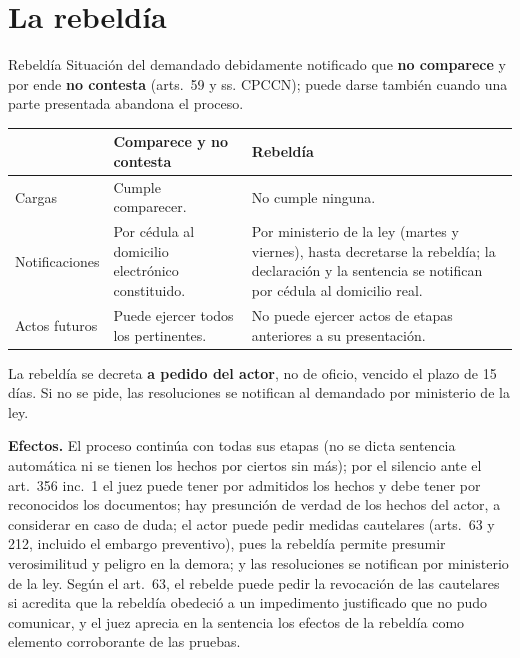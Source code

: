\documentclass[12pt,oneside]{book}
\renewcommand{\arraystretch}{1.15}
\begin{document}
\section{La rebeldía}

\begin{definicion}{Rebeldía}
Situación del demandado debidamente notificado que \textbf{no comparece} y por ende \textbf{no contesta} (arts.~59 y ss. CPCCN); puede darse también cuando una parte presentada abandona el proceso.
\end{definicion}

\begin{table}[H]
\centering
\renewcommand{\arraystretch}{1.25}
\begin{tabularx}{\textwidth}{>{\RaggedRight\arraybackslash}p{}>{\RaggedRight\arraybackslash}X>{\RaggedRight\arraybackslash}X}
\toprule
 & \textbf{Comparece y no contesta} & \textbf{Rebeldía} \\
\midrule
Cargas & Cumple comparecer. & No cumple ninguna. \\
Notificaciones & Por cédula al domicilio electrónico constituido. & Por ministerio de la ley (martes y viernes), hasta decretarse la rebeldía; la declaración y la sentencia se notifican por cédula al domicilio real. \\
Actos futuros & Puede ejercer todos los pertinentes. & No puede ejercer actos de etapas anteriores a su presentación. \\
\bottomrule
\end{tabularx}
\end{table}

La rebeldía se decreta \textbf{a pedido del actor}, no de oficio, vencido el plazo de 15 días. Si no se pide, las resoluciones se notifican al demandado por ministerio de la ley. %

\textbf{Efectos.} El proceso continúa con todas sus etapas (no se dicta sentencia automática ni se tienen los hechos por ciertos sin más); por el silencio ante el art.~356 inc.~1 el juez puede tener por admitidos los hechos y debe tener por reconocidos los documentos; hay presunción de verdad de los hechos del actor, a considerar en caso de duda; el actor puede pedir medidas cautelares (arts.~63 y 212, incluido el embargo preventivo), pues la rebeldía permite presumir verosimilitud y peligro en la demora; y las resoluciones se notifican por ministerio de la ley. Según el art.~63, el rebelde puede pedir la revocación de las cautelares si acredita que la rebeldía obedeció a un impedimento justificado que no pudo comunicar, y el juez aprecia en la sentencia los efectos de la rebeldía como elemento corroborante de las pruebas.
\end{document}

